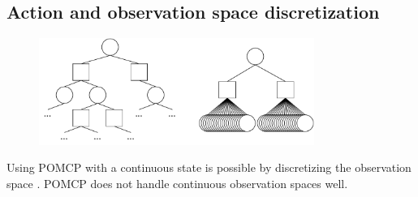 \subsection{Action and observation space discretization}
\label{sec:discretization}

\begin{figure}[htbp]
    \centering
    \includegraphics[width=0.8\textwidth]{figures/pomcp_continuous.pdf}
\end{figure}

Using POMCP with a continuous state is possible by discretizing the observation space \parencite{pomcp_continuous}.
POMCP does not handle continuous observation spaces well. 






